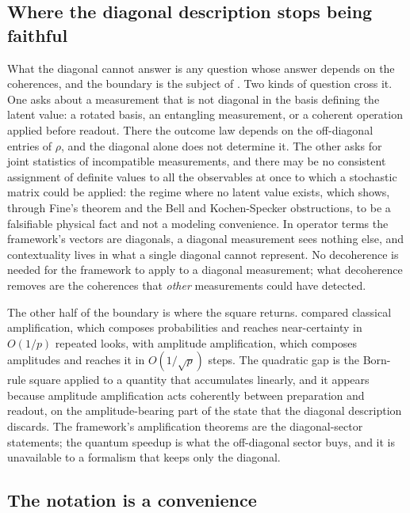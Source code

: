\subsection*{Where the diagonal description stops being faithful}

What the diagonal cannot answer is any question whose answer depends on
the coherences, and the boundary is the subject of
. Two kinds of question cross it. One asks
about a measurement that is not diagonal in the basis defining the latent
value: a rotated basis, an entangling measurement, or a coherent
operation applied before readout. There the outcome law depends on the
off-diagonal entries of $\rho$, and the diagonal alone does not determine
it. The other asks for joint statistics of incompatible measurements, and
there may be no consistent assignment of definite values to all the
observables at once to which a stochastic matrix could be applied: the
regime where no latent value exists, which
 shows, through Fine's theorem and the Bell
and Kochen-Specker obstructions, to be a falsifiable physical fact and not
a modeling convenience. In operator terms the framework's vectors are
diagonals, a diagonal measurement sees nothing else, and contextuality
lives in what a single diagonal cannot represent. No decoherence is needed
for the framework to apply to a diagonal measurement; what decoherence
removes are the coherences that \emph{other} measurements could have
detected.

The other half of the boundary is where the square returns.
 compared classical amplification, which composes
probabilities and reaches near-certainty in $O(1/p)$ repeated looks, with
amplitude amplification, which composes amplitudes and reaches it in
$O(1/\sqrt{p})$ steps. The quadratic gap is the Born-rule square applied to a
quantity that accumulates linearly, and it appears because amplitude
amplification acts coherently between preparation and readout, on the
amplitude-bearing part of the state that the diagonal description
discards. The framework's amplification theorems are the
diagonal-sector statements; the quantum speedup is what the off-diagonal sector
buys, and it is unavailable to a formalism that keeps only the diagonal.

\subsection*{The notation is a convenience}

